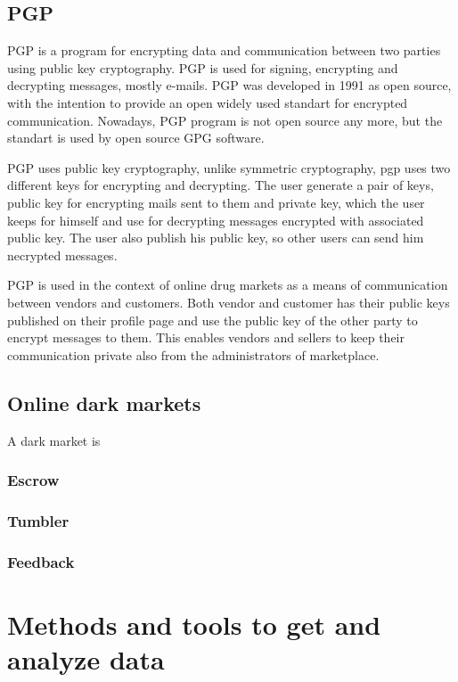 \documentclass[
  digital, %
  table,   %
  lof,     %
  lot,     %
  oneside
]{fithesis3}
\begin{document}
\section{PGP}

PGP is a program for encrypting data and communication between two parties using public key cryptography.
PGP is used for signing, encrypting and decrypting messages, mostly e-mails.
PGP was developed in 1991 as open source, with the intention 
to provide an open widely used standart for encrypted communication.
Nowadays, PGP program is not open source any more, but the standart is used by open source GPG software.

PGP uses public key cryptography, unlike symmetric cryptography, pgp uses two different keys for encrypting and decrypting.
The user generate a pair of keys, public key for encrypting mails sent to them and private key, which the user
 keeps for himself and use for decrypting messages encrypted with associated public key. The user also publish his public
 key, so other users can send him necrypted messages.

PGP is used in the context of online drug markets as a means of communication between vendors and customers.
Both vendor and customer has their public keys published on their profile page and use the public key of the other
party to encrypt messages to them. This enables vendors and sellers to keep their communication private also 
from the administrators of marketplace.


\section{Online dark markets}

A dark market is  

\subsection{Escrow}
\subsection{Tumbler}
\subsection{Feedback}


\chapter{Methods and tools to get and analyze data}
\end{document}
